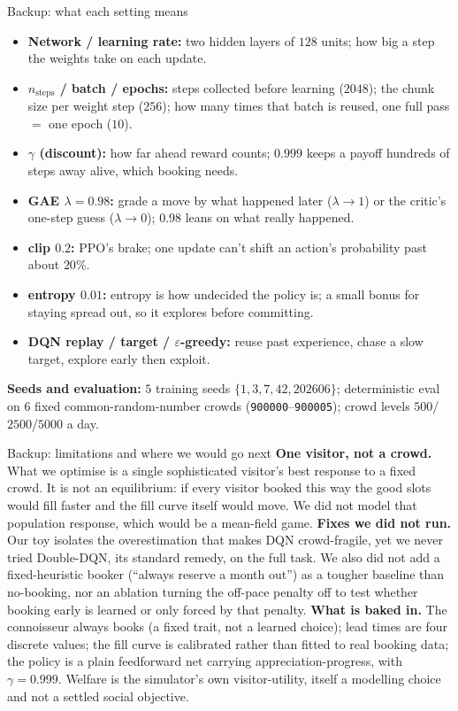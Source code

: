 \documentclass[aspectratio=169, 11pt, t]{beamer}
\newcommand{\emp}[1]{#1}
\begin{document}
\begin{frame}{Backup: what each setting means}
\small
\vfill
\begin{itemize}\setlength\itemsep{0pt}
\item \textbf{Network / learning rate:} two hidden layers of $128$ units; how big a step the weights
take on each update.
\item \textbf{$n_{\text{steps}}$ / batch / epochs:} steps collected before learning ($2048$); the chunk
size per weight step ($256$); how many times that batch is reused, one full pass $=$ one epoch ($10$).
\item \textbf{$\gamma$ (discount):} how far ahead reward counts; $0.999$ keeps a payoff hundreds of
steps away alive, which booking needs.
\item \textbf{GAE $\lambda=0.98$:} grade a move by what happened later ($\lambda\to1$) or the critic's
one-step guess ($\lambda\to0$); $0.98$ leans on what really happened.
\item \textbf{clip $0.2$:} PPO's brake; one update can't shift an action's probability past about $20\%$.
\item \textbf{entropy $0.01$:} entropy is how undecided the policy is; a small bonus for staying spread
out, so it explores before committing.
\item \textbf{DQN replay / target / $\varepsilon$-greedy:} reuse past experience, chase a slow target,
explore early then exploit.
\end{itemize}
\vfill
\textbf{Seeds and evaluation:} $5$ training seeds $\{1,3,7,42,202606\}$; deterministic eval on $6$ fixed
common-random-number crowds (\texttt{900000}--\texttt{900005}); crowd levels $500$/$2500$/$5000$ a day.
\vfill
\end{frame}

\begin{frame}{Backup: limitations and where we would go next}
\small
\vfill
\textbf{One visitor, not a crowd.} What we optimise is a single sophisticated visitor's best response to
a \emp{fixed} crowd. It is not an equilibrium: if every visitor booked this way the good slots would
fill faster and the fill curve itself would move. We did not model that population response, which would
be a mean-field game.
\vfill
\textbf{Fixes we did not run.} Our toy isolates the overestimation that makes DQN crowd-fragile, yet we
never tried Double-DQN, its standard remedy, on the full task. We also did not add a fixed-heuristic
booker (``always reserve a month out'') as a tougher baseline than no-booking, nor an ablation turning
the off-pace penalty off to test whether booking early is learned or only forced by that penalty.
\vfill
\textbf{What is baked in.} The connoisseur always books (a fixed trait, not a learned choice); lead times
are four discrete values; the fill curve is calibrated rather than fitted to real booking data; the policy
is a plain feedforward net carrying appreciation-progress, with $\gamma=0.999$. Welfare is the
simulator's own visitor-utility, itself a modelling choice and not a settled social objective.
\vfill
\end{frame}
\end{document}
